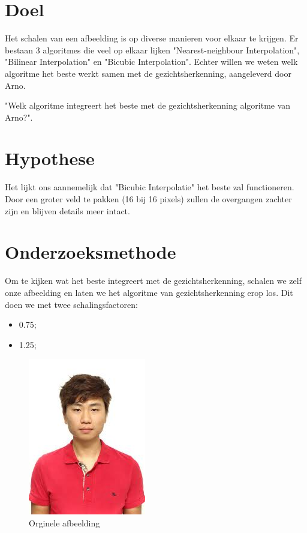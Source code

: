 \documentclass{article}
\begin{document}


\clearpage

\renewcommand{\contentsname}{Inhoudsopgave}
\tableofcontents

\clearpage

\section{Doel}
Het schalen van een afbeelding is op diverse manieren voor elkaar te krijgen. Er bestaan 3 algoritmes die veel op elkaar lijken "Nearest-neighbour Interpolation", "Bilinear Interpolation" en "Bicubic Interpolation". Echter willen we weten welk algoritme het beste werkt samen met de gezichtsherkenning, aangeleverd door Arno.  

\begin{center}
    "Welk algoritme integreert het beste met de gezichtsherkenning algoritme van Arno?".   
\end{center}

\section{Hypothese}

Het lijkt ons aannemelijk dat "Bicubic Interpolatie" het beste zal functioneren. Door een groter veld te pakken (16 bij 16 pixels) zullen de overgangen zachter zijn en blijven details meer intact.

\section{Onderzoeksmethode}
Om te kijken wat het beste integreert met de gezichtsherkenning, schalen we zelf onze afbeelding en laten we het algoritme van gezichtsherkenning erop los. Dit doen we met twee schalingsfactoren:

\begin{itemize}
    \item 0.75;
    \item 1.25;
\end{itemize}

\begin{figure}[H]
    \centering
    \includegraphics{assets/male-1.png}
    \caption{Orginele afbeelding}
    \label{fig:my_label}
\end{figure}
\end{document}

